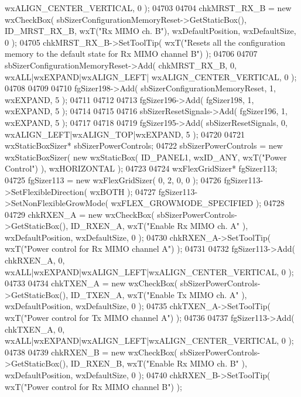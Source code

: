\begin{DoxyCode}
      wxALIGN\_CENTER\_VERTICAL, 0 );
04703     
04704     chkMRST_RX_B = \textcolor{keyword}{new} wxCheckBox( sbSizerConfigurationMemoryReset->GetStaticBox(), 
      ID_MRST_RX_B, wxT(\textcolor{stringliteral}{"Rx MIMO ch. B"}), wxDefaultPosition, wxDefaultSize, 0 );
04705     chkMRST_RX_B->SetToolTip( wxT(\textcolor{stringliteral}{"Resets all the configuration memory to the default state for Rx MIMO
       channel B"}) );
04706     
04707     sbSizerConfigurationMemoryReset->Add( chkMRST_RX_B, 0, wxALL|wxEXPAND|wxALIGN\_LEFT|
      wxALIGN\_CENTER\_VERTICAL, 0 );
04708     
04709     
04710     fgSizer198->Add( sbSizerConfigurationMemoryReset, 1, wxEXPAND, 5 );
04711     
04712     
04713     fgSizer196->Add( fgSizer198, 1, wxEXPAND, 5 );
04714     
04715     
04716     sbSizerResetSignals->Add( fgSizer196, 1, wxEXPAND, 5 );
04717     
04718     
04719     fgSizer195->Add( sbSizerResetSignals, 0, wxALIGN\_LEFT|wxALIGN\_TOP|wxEXPAND, 5 );
04720     
04721     wxStaticBoxSizer* sbSizerPowerControls;
04722     sbSizerPowerControls = \textcolor{keyword}{new} wxStaticBoxSizer( \textcolor{keyword}{new} wxStaticBox( ID_PANEL1, wxID\_ANY, wxT(\textcolor{stringliteral}{"Power Control"})
       ), wxHORIZONTAL );
04723     
04724     wxFlexGridSizer* fgSizer113;
04725     fgSizer113 = \textcolor{keyword}{new} wxFlexGridSizer( 0, 2, 0, 0 );
04726     fgSizer113->SetFlexibleDirection( wxBOTH );
04727     fgSizer113->SetNonFlexibleGrowMode( wxFLEX\_GROWMODE\_SPECIFIED );
04728     
04729     chkRXEN_A = \textcolor{keyword}{new} wxCheckBox( sbSizerPowerControls->GetStaticBox(), ID_RXEN_A, wxT(\textcolor{stringliteral}{"Enable Rx MIMO ch. A"}
      ), wxDefaultPosition, wxDefaultSize, 0 );
04730     chkRXEN_A->SetToolTip( wxT(\textcolor{stringliteral}{"Power control for Rx MIMO channel A"}) );
04731     
04732     fgSizer113->Add( chkRXEN_A, 0, wxALL|wxEXPAND|wxALIGN\_LEFT|wxALIGN\_CENTER\_VERTICAL, 0 );
04733     
04734     chkTXEN_A = \textcolor{keyword}{new} wxCheckBox( sbSizerPowerControls->GetStaticBox(), ID_TXEN_A, wxT(\textcolor{stringliteral}{"Enable Tx MIMO ch. A"}
      ), wxDefaultPosition, wxDefaultSize, 0 );
04735     chkTXEN_A->SetToolTip( wxT(\textcolor{stringliteral}{"Power control for Tx MIMO channel A"}) );
04736     
04737     fgSizer113->Add( chkTXEN_A, 0, wxALL|wxEXPAND|wxALIGN\_LEFT|wxALIGN\_CENTER\_VERTICAL, 0 );
04738     
04739     chkRXEN_B = \textcolor{keyword}{new} wxCheckBox( sbSizerPowerControls->GetStaticBox(), ID_RXEN_B, wxT(\textcolor{stringliteral}{"Enable Rx MIMO ch. B"}
      ), wxDefaultPosition, wxDefaultSize, 0 );
04740     chkRXEN_B->SetToolTip( wxT(\textcolor{stringliteral}{"Power control for Rx MIMO channel B"}) );

\end{DoxyCode}
